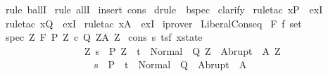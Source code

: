 \begin{isabellebody}
\ {\isacharparenleft}rule\ ballI{\isacharparenright}\isanewline
{}\isamarkupfalse%
\ {\isacharparenleft}rule\ allI{\isacharparenright}\isanewline
{}\isamarkupfalse%
\ {\isacharparenleft}insert\ cons{\isacharparenright}\isanewline
{}\isamarkupfalse%
\ {\isacharparenleft}drule\ {\isacharparenleft}{}{\isacharparenright}\ bspec{\isacharparenright}\isanewline
{}\isamarkupfalse%
\ clarify\isanewline
{}\isamarkupfalse%
\ {\isacharparenleft}rule{\isacharunderscore}tac\ x{\isacharequal}P{\isacharprime}\ \ exI{\isacharparenright}\isanewline
{}\isamarkupfalse%
\ {\isacharparenleft}rule{\isacharunderscore}tac\ x{\isacharequal}Q{\isacharprime}\ \ exI{\isacharparenright}\isanewline
{}\isamarkupfalse%
\ {\isacharparenleft}rule{\isacharunderscore}tac\ x{\isacharequal}A{\isacharprime}\ \ exI{\isacharparenright}\isanewline
{}\isamarkupfalse%
\ iprover\isanewline
{}\isamarkupfalse%
%
\endisatagproof
{\isafoldproof}%
%
\isadelimproof
\isanewline
%
\endisadelimproof
\isanewline
{}\isamarkupfalse%
\ LiberalConseq{\isacharprime}{\isacharprime}{\isacharcolon}\isanewline
{}\ F{\isacharcolon}{\isacharcolon}\ {\isachardoublequoteopen}{\isacharprime}f\ set{\isachardoublequoteclose}\isanewline
{}\ spec{\isacharcolon}\ {\isachardoublequoteopen}{\isasymforall}Z{\isachardot}\ {\isasymGamma}{\isacharcomma}{\isasymTheta}{\isasymturnstile}\isactrlbsub {\isacharslash}F\isactrlesub \ {\isacharparenleft}P{\isacharprime}\ Z{\isacharparenright}\ c\ {\isacharparenleft}Q{\isacharprime}\ Z{\isacharparenright}{\isacharcomma}{\isacharparenleft}A{\isacharprime}\ Z{\isacharparenright}{\isachardoublequoteclose}\isanewline
{}\ cons{\isacharcolon}\ {\isachardoublequoteopen}{\isasymforall}s\ {\isacharparenleft}t{\isacharcolon}{\isacharcolon}{\isacharparenleft}{\isacharprime}s{\isacharcomma}{\isacharprime}f{\isacharparenright}\ xstate{\isacharparenright}{\isachardot}\ \isanewline
\ \ \ \ \ \ \ \ \ \ \ \ \ \ \ \ \ {\isacharparenleft}{\isasymforall}Z{\isachardot}\ s\ {\isasymin}\ P{\isacharprime}\ Z\ {\isasymlongrightarrow}\ t\ {\isasymin}\ Normal\ {\isacharbackquote}\ Q{\isacharprime}\ Z\ {\isasymunion}\ Abrupt\ {\isacharbackquote}\ A{\isacharprime}\ Z{\isacharparenright}\isanewline
\ \ \ \ \ \ \ \ \ \ \ \ \ \ \ \ \ \ {\isasymlongrightarrow}\ {\isacharparenleft}s\ {\isasymin}\ P\ {\isasymlongrightarrow}\ t\ {\isasymin}\ Normal\ {\isacharbackquote}\ Q\ {\isasymunion}\ Abrupt\ {\isacharbackquote}\ A{\isacharparenright}{\isachardoublequoteclose}\isanewline

\end{isabellebody}
